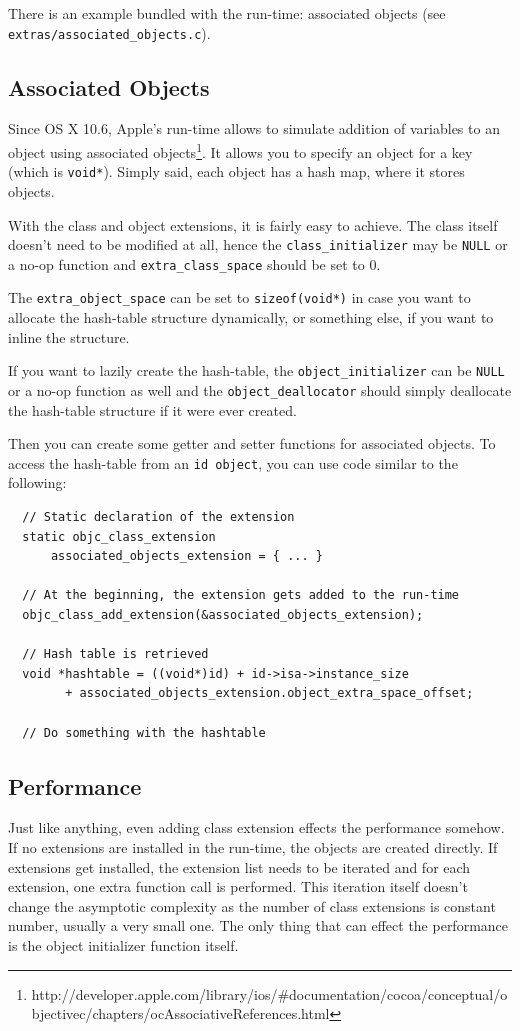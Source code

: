 There is an example bundled with the run-time: associated objects (see \verb=extras/associated_objects.c=).

\subsection{Associated Objects}

Since OS X 10.6, Apple's run-time allows to simulate addition of variables to an object using associated objects\footnote{http://developer.apple.com/library/ios/#documentation/cocoa/conceptual/objectivec/chapters/ocAssociativeReferences.html}. It allows you to specify an object for a key (which is \verb=void*=). Simply said, each object has a hash map, where it stores objects.

With the class and object extensions, it is fairly easy to achieve. The class itself doesn't need to be modified at all, hence the \verb=class_initializer= may be \verb=NULL= or a no-op function and \verb=extra_class_space= should be set to 0.

The \verb=extra_object_space= can be set to \verb=sizeof(void*)= in case you want to allocate the hash-table structure dynamically, or something else, if you want to inline the structure.

If you want to lazily create the hash-table, the \verb=object_initializer= can be \verb=NULL= or a no-op function as well and the \verb=object_deallocator= should simply deallocate the hash-table structure if it were ever created.

Then you can create some getter and setter functions for associated objects. To access the hash-table from an \verb=id object=, you can use code similar to the following:

\begin{verbatim}
  // Static declaration of the extension
  static objc_class_extension 
      associated_objects_extension = { ... }

  // At the beginning, the extension gets added to the run-time
  objc_class_add_extension(&associated_objects_extension);

  // Hash table is retrieved
  void *hashtable = ((void*)id) + id->isa->instance_size 
        + associated_objects_extension.object_extra_space_offset;
        
  // Do something with the hashtable
\end{verbatim}


\subsection{Performance}
Just like anything, even adding class extension effects the performance somehow. If no extensions are installed in the run-time, the objects are created directly. If extensions get installed, the extension list needs to be iterated and for each extension, one extra function call is performed. This iteration itself doesn't change the asymptotic complexity as the number of class extensions is constant number, usually a very small one. The only thing that can effect the performance is the object initializer function itself.

